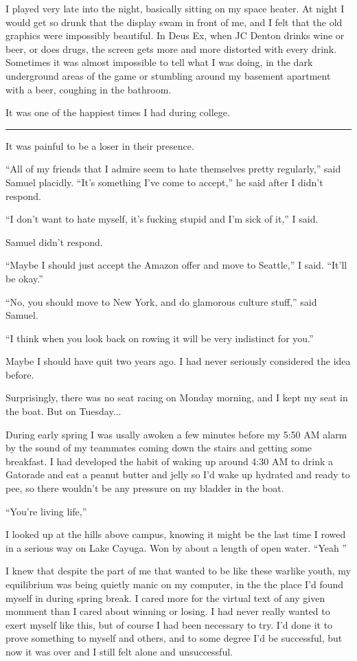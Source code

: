 I played very late into the night, basically sitting on my space heater.  At
night I would get so drunk that the display swam in front of me, and I felt that
the old graphics were impossibly beautiful.  In Deus Ex, when JC Denton drinks
wine or beer, or does drugs, the screen gets more and more distorted with every
drink.  Sometimes it was almost impossible to tell what I was doing, in the dark
underground areas of the game or stumbling around my basement apartment with a
beer, coughing in the bathroom.

It was one of the happiest times I had during college.

\plainfancybreak{12pt}{2}{* * *}

It was painful to be a loser in their presence.  

``All of my friends that I admire seem to hate themselves pretty regularly,''
said Samuel placidly.  ``It's something I've come to accept,'' he said after I
didn't respond.

``I don't want to hate myself, it's fucking stupid and I'm sick of it,'' I said.  

Samuel didn't respond.

``Maybe I should just accept the Amazon offer and move to Seattle,'' I said.
``It'll be okay.''

``No, you should move to New York, and do glamorous culture stuff,'' said
Samuel.

``I think when you look back on rowing it will be very indistinct for you.'' 

Maybe I should have quit two years ago.  I had never seriously considered the
idea before.

Surprisingly, there was no seat racing on Monday morning, and I kept my seat in
the boat.  But on Tuesday...

During early spring I was usally awoken a few minutes before my 5:50 AM alarm by
the sound of my teammates coming down the stairs and getting some breakfast.  I
had developed the habit of waking up around 4:30 AM to drink a Gatorade and eat
a peanut butter and jelly so I'd wake up hydrated and ready to pee, so there
wouldn't be any pressure on my bladder in the boat. 

``You're living life,''

I looked up at the hills above campus, knowing it might be the last time I rowed
in a serious way on Lake Cayuga.  Won by about a length of open water.  ``Yeah
'' 

I knew that despite the part of me that wanted to be like these warlike youth,
my equilibrium was being quietly manic on my computer, in the the place I'd
found myself in during spring break.  I cared more for the virtual text of any
given momment than I cared about winning or losing.  I had never really wanted
to exert myself like this, but of course I had been necessary to try.  I'd done
it to prove something to myself and others, and to some degree I'd be
successful, but now it was over and I still felt alone and unsuccessful.


